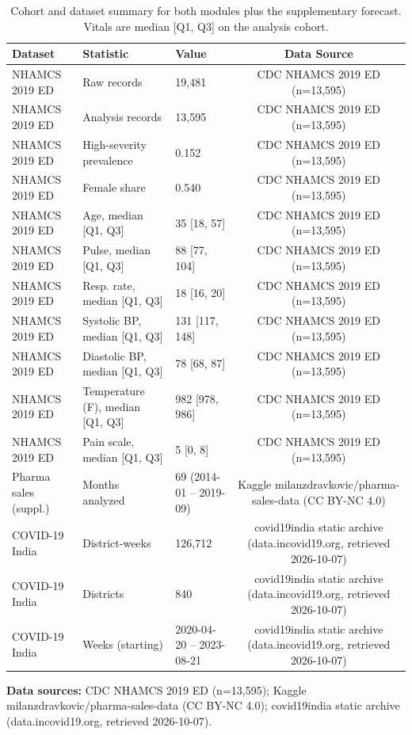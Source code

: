 \begin{table}[t]
\centering
\caption{Cohort and dataset summary for both modules plus the supplementary forecast. Vitals are median [Q1, Q3] on the analysis cohort.}
\label{tab:cohort}
\begin{tabular}{lllc}
\toprule
Dataset & Statistic & Value & Data Source \\
\midrule
NHAMCS 2019 ED & Raw records & 19,481 & CDC NHAMCS 2019 ED (n=13,595) \\
NHAMCS 2019 ED & Analysis records & 13,595 & CDC NHAMCS 2019 ED (n=13,595) \\
NHAMCS 2019 ED & High-severity prevalence & 0.152 & CDC NHAMCS 2019 ED (n=13,595) \\
NHAMCS 2019 ED & Female share & 0.540 & CDC NHAMCS 2019 ED (n=13,595) \\
NHAMCS 2019 ED & Age, median [Q1, Q3] & 35 [18, 57] & CDC NHAMCS 2019 ED (n=13,595) \\
NHAMCS 2019 ED & Pulse, median [Q1, Q3] & 88 [77, 104] & CDC NHAMCS 2019 ED (n=13,595) \\
NHAMCS 2019 ED & Resp. rate, median [Q1, Q3] & 18 [16, 20] & CDC NHAMCS 2019 ED (n=13,595) \\
NHAMCS 2019 ED & Systolic BP, median [Q1, Q3] & 131 [117, 148] & CDC NHAMCS 2019 ED (n=13,595) \\
NHAMCS 2019 ED & Diastolic BP, median [Q1, Q3] & 78 [68, 87] & CDC NHAMCS 2019 ED (n=13,595) \\
NHAMCS 2019 ED & Temperature (F), median [Q1, Q3] & 982 [978, 986] & CDC NHAMCS 2019 ED (n=13,595) \\
NHAMCS 2019 ED & Pain scale, median [Q1, Q3] & 5 [0, 8] & CDC NHAMCS 2019 ED (n=13,595) \\
Pharma sales (suppl.) & Months analyzed & 69 (2014-01 – 2019-09) & Kaggle milanzdravkovic/pharma-sales-data (CC BY-NC 4.0) \\
COVID-19 India & District-weeks & 126,712 & covid19india static archive (data.incovid19.org, retrieved 2026-10-07) \\
COVID-19 India & Districts & 840 & covid19india static archive (data.incovid19.org, retrieved 2026-10-07) \\
COVID-19 India & Weeks (starting) & 2020-04-20 – 2023-08-21 & covid19india static archive (data.incovid19.org, retrieved 2026-10-07) \\
\bottomrule
\end{tabular}
\par\vspace{2pt}\raggedright\footnotesize \textbf{Data sources:} CDC NHAMCS 2019 ED (n=13,595); Kaggle milanzdravkovic/pharma-sales-data (CC BY-NC 4.0); covid19india static archive (data.incovid19.org, retrieved 2026-10-07).
\end{table}
